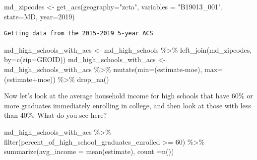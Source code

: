 \documentclass[
  letterpaper,
  DIV=11,
  numbers=noendperiod]{scrreprt}
\newenvironment{Shaded}{\begin{snugshade}}{\end{snugshade}}
\newcommand{\AttributeTok}[1]{\textcolor[rgb]{0.40,0.45,0.13}{#1}}
\newcommand{\DecValTok}[1]{\textcolor[rgb]{0.68,0.00,0.00}{#1}}
\newcommand{\FunctionTok}[1]{\textcolor[rgb]{0.28,0.35,0.67}{#1}}
\newcommand{\NormalTok}[1]{\textcolor[rgb]{0.00,0.23,0.31}{#1}}
\newcommand{\OtherTok}[1]{\textcolor[rgb]{0.00,0.23,0.31}{#1}}
\newcommand{\SpecialCharTok}[1]{\textcolor[rgb]{0.37,0.37,0.37}{#1}}
\newcommand{\StringTok}[1]{\textcolor[rgb]{0.13,0.47,0.30}{#1}}
\begin{document}
\begin{Shaded}
\begin{Highlighting}[]
\NormalTok{md\_zipcodes }\OtherTok{\textless{}{-}} \FunctionTok{get\_acs}\NormalTok{(}\AttributeTok{geography=}\StringTok{"zcta"}\NormalTok{, }\AttributeTok{variables =} \StringTok{"B19013\_001"}\NormalTok{, }\AttributeTok{state=}\StringTok{\textquotesingle{}MD\textquotesingle{}}\NormalTok{, }\AttributeTok{year=}\DecValTok{2019}\NormalTok{)}
\end{Highlighting}
\end{Shaded}

\begin{verbatim}
Getting data from the 2015-2019 5-year ACS
\end{verbatim}

\begin{Shaded}
\begin{Highlighting}[]
\NormalTok{md\_high\_schools\_with\_acs }\OtherTok{\textless{}{-}}\NormalTok{ md\_high\_schools }\SpecialCharTok{\%\textgreater{}\%} \FunctionTok{left\_join}\NormalTok{(md\_zipcodes, }\AttributeTok{by=}\FunctionTok{c}\NormalTok{(}\StringTok{\textquotesingle{}zip\textquotesingle{}}\OtherTok{=}\StringTok{\textquotesingle{}GEOID\textquotesingle{}}\NormalTok{))}
\NormalTok{md\_high\_schools\_with\_acs }\OtherTok{\textless{}{-}}\NormalTok{ md\_high\_schools\_with\_acs }\SpecialCharTok{\%\textgreater{}\%} \FunctionTok{mutate}\NormalTok{(}\AttributeTok{min=}\NormalTok{(estimate}\SpecialCharTok{{-}}\NormalTok{moe), }\AttributeTok{max=}\NormalTok{(estimate}\SpecialCharTok{+}\NormalTok{moe)) }\SpecialCharTok{\%\textgreater{}\%} \FunctionTok{drop\_na}\NormalTok{()}
\end{Highlighting}
\end{Shaded}

Now let's look at the average household income for high schools that
have 60\% or more graduates immediately enrolling in college, and then
look at those with less than 40\%. What do you see here?

\begin{Shaded}
\begin{Highlighting}[]
\NormalTok{md\_high\_schools\_with\_acs }\SpecialCharTok{\%\textgreater{}\%}
  \FunctionTok{filter}\NormalTok{(percent\_of\_high\_school\_graduates\_enrolled }\SpecialCharTok{\textgreater{}=} \DecValTok{60}\NormalTok{) }\SpecialCharTok{\%\textgreater{}\%} 
  \FunctionTok{summarize}\NormalTok{(}\AttributeTok{avg\_income =} \FunctionTok{mean}\NormalTok{(estimate), }\AttributeTok{count =}\FunctionTok{n}\NormalTok{())}
\end{Highlighting}
\end{Shaded}
\end{document}
